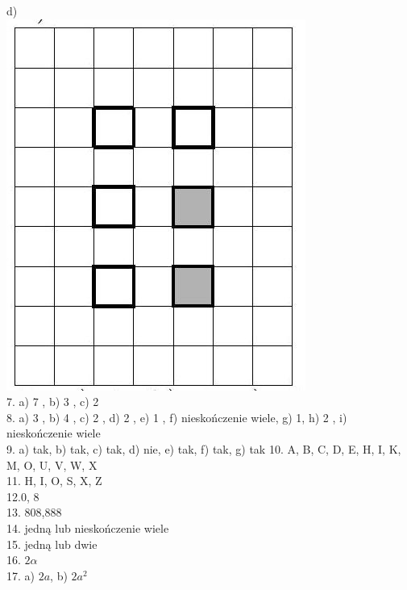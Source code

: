 \documentclass[10pt]{article}
\begin{document}
d)\\
\includegraphics[max width=\textwidth, center]{2024_11_21_71f62bd117d375398909g-210}\\
7. a) 7 , b) 3 , c) 2\\
8. a) 3 , b) 4 , c) 2 , d) 2 , e) 1 , f) nieskończenie wiele, g) 1, h) 2 , i) nieskończenie wiele\\
9. a) tak, b) tak, c) tak, d) nie, e) tak, f) tak, g) tak 10. A, B, C, D, E, H, I, K, M, O, U, V, W, X\\
11. H, I, O, S, X, Z\\
12.0, 8\\
13. 808,888\\
14. jedną lub nieskończenie wiele\\
15. jedną lub dwie\\
16. \(2 \alpha\)\\
17. a) \(2 a\), b) \(2 a^{2}\)
\end{document}

